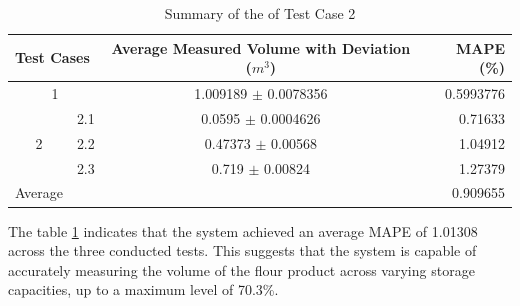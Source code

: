 \begin{table}[H]
	\centering
	\caption{Summary of the of Test Case 2}
	\label{ch4:tab:test-cases-summary}
	\begin{tabular}{c l c r}
		\toprule
		\multicolumn{2}{l}{\textbf{Test Cases}} & \textbf{Average Measured Volume with Deviation ($m^{3}$)} & \textbf{MAPE (\%)}                \\ \midrule

		\multicolumn{2}{c}{1}                   & 1.009189 $\pm$ 0.0078356                                  & 0.5993776                         \\

		{}                                      & 2.1                                                       & 0.0595 $\pm$ 0.0004626 & 0.71633  \\

		2                                       & 2.2                                                       & 0.47373 $\pm$ 0.00568  & 1.04912  \\

		{}                                      & 2.3                                                       & 0.719 $\pm$ 0.00824    & 1.27379  \\ \midrule

		Average                                 & {}                                                        & {}                     & 0.909655 \\ \bottomrule
	\end{tabular}
\end{table}

The table \ref{ch4:tab:test-cases-summary} indicates that the system achieved an average MAPE of 1.01308 across the three conducted tests. This suggests that the system is capable of accurately measuring the volume of the flour product across varying storage capacities, up to a maximum level of 70.3\%.